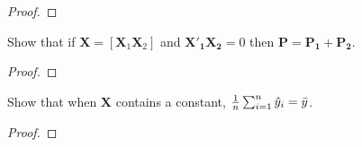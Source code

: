 \documentclass[12pt]{article}
\newenvironment{question}[2][Question]{\begin{trivlist}
\item[\hskip \labelsep {\bfseries #1}\hskip \labelsep {\bfseries #2.}]}{\end{trivlist}}
\begin{document}
\begin{proof}
\end{proof}

\begin{question}{3.10}
Show that if $\bm{X} = [\bm{X}_1\bm{X}_2]$ and $\bm{X'_1X_2} = 0$ then $\bm{P} = \bm{P_1}+\bm{P_2}$.
\end{question}

\begin{proof}
\end{proof}

\begin{question}{3.11}
Show that when $\bm{X}$ contains a constant, $\frac{1}{n}\sum_{i = 1}^{n}\hat{y}_i = \Bar{y}$.
\end{question}

\begin{proof}
\end{proof}
\end{document}
